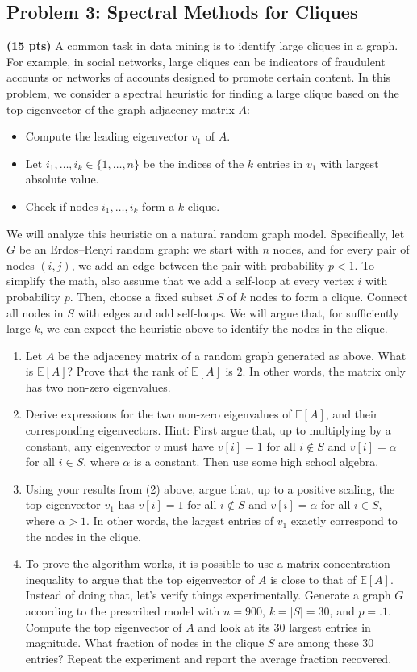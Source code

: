 \documentclass[10pt]{article}
\newcommand{\E}{\mathbb{E}}
\begin{document}
\subsection{Problem 3: Spectral Methods for Cliques}
\textbf{(15 pts)} A common task in data mining is to identify large cliques in a graph. For example, in social networks, large cliques can be indicators of fraudulent accounts or networks of accounts designed to promote certain content. In this problem, we consider a spectral heuristic for finding a large clique based on the top eigenvector of the graph adjacency matrix $A$:
\begin{itemize}
	\item Compute the leading eigenvector $v_1$ of $A$.
	\item Let $i_1, \ldots, i_k \in \{1, \ldots, n\}$ be the indices of the $k$ entries in $v_1$ with largest absolute value.
	\item Check if nodes $i_1, \ldots, i_k$ form a $k$-clique.
\end{itemize}

We will analyze this heuristic on a natural random graph model. Specifically, let $G$ be an Erdos--Renyi random graph: we start with $n$ nodes, and for every pair of nodes $(i, j)$, we add an edge between the pair with probability $p < 1$. To simplify the math, also assume that we add a self-loop at every vertex $i$ with probability $p$. Then, choose a fixed subset $S$ of $k$ nodes to form a clique. Connect all nodes in $S$ with edges and add self-loops. We will argue that, for sufficiently large $k$, we can expect the heuristic above to identify the nodes in the clique.

\begin{enumerate}
	\item Let $A$ be the adjacency matrix of a random graph generated as above. What is $\E[A]$? Prove that the rank of $\E[A]$ is $2$. In other words, the matrix only has two non-zero eigenvalues.
	\item Derive expressions for the two non-zero eigenvalues of $\E[A]$, and their corresponding eigenvectors. Hint: First argue that, up to multiplying by a constant, any eigenvector $v$ must have $v[i] = 1$ for all $i \notin S$ and $v[i] = \alpha$ for all $i \in S$, where $\alpha$ is a constant. Then use some high school algebra.
	\item Using your results from (2) above, argue that, up to a positive scaling, the top eigenvector $v_1$ has $v[i] = 1$ for all $i \notin S$ and $v[i] = \alpha$ for all $i \in S$, where $\alpha > 1$. In other words, the largest entries of $v_1$ exactly correspond to the nodes in the clique.
	\item To prove the algorithm works, it is possible to use a matrix concentration inequality to argue that the top eigenvector of $A$ is close to that of $\E[A]$. Instead of doing that, let's verify things experimentally. Generate a graph $G$ according to the prescribed model with $n = 900$, $k = |S| = 30$, and $p = .1$. Compute the top eigenvector of $A$ and look at its 30 largest entries in magnitude. What fraction of nodes in the clique $S$ are among these 30 entries? Repeat the experiment and report the average fraction recovered.
\end{enumerate}
\end{document}
